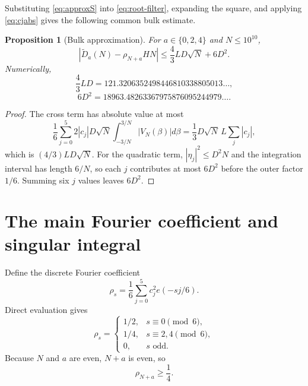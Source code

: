 \documentclass[11pt]{article}
\newtheorem{proposition}[theorem]{Proposition}
\theoremstyle{definition}
\newcommand{\abs}[1]{\left|#1\right|}
\begin{document}
Substituting \eqref{eq:approxS} into \eqref{eq:root-filter}, expanding the square, and applying \eqref{eq:cjabs} gives the following common bulk estimate.

\begin{proposition}[Bulk approximation]\label{prop:bulk}
For $a\in\{0,2,4\}$ and $N\le10^{10}$,
\begin{equation}\label{eq:bulk-bound}
\boxed{
\abs{\widetilde D_a(N)-\rho_{N+a}HN}
\le\frac43LD\sqrt N+6D^2.
}
\end{equation}
Numerically,
\begin{equation}\label{eq:AB}
\frac43LD
=121.3206352498446810338805013\ldots,
\end{equation}
\begin{equation}
6D^2
=18963.48263367975876095244979\ldots.
\end{equation}
\end{proposition}
\begin{proof}
The cross term has absolute value at most
\[
\frac16\sum_{j=0}^5
2\abs{c_j}D\sqrt N
\int_{-3/N}^{3/N}\abs{V_N(\beta)}d\beta
=\frac13D\sqrt N\,L\sum_j\abs{c_j},
\]
which is $(4/3)LD\sqrt N$. For the quadratic term, $\abs{\eta_j}^2\le D^2N$ and the integration interval has length $6/N$, so each $j$ contributes at most $6D^2$ before the outer factor $1/6$. Summing six $j$ values leaves $6D^2$.
\end{proof}

\section{The main Fourier coefficient and singular integral}\label{sec:maincoefficient}

Define the discrete Fourier coefficient
\begin{equation}\label{eq:rho}
\rho_s
=\frac16\sum_{j=0}^5c_j^2e(-sj/6).
\end{equation}
Direct evaluation gives
\begin{equation}\label{eq:rho-values}
\rho_s=
\begin{cases}
1/2,&s\equiv0\pmod6,\\
1/4,&s\equiv2,4\pmod6,\\
0,&s\text{ odd}.
\end{cases}
\end{equation}
Because $N$ and $a$ are even, $N+a$ is even, so
\begin{equation}\label{eq:rho-lower}
\rho_{N+a}\ge\frac14.
\end{equation}
\end{document}
